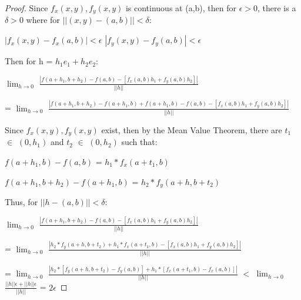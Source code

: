     \begin{proof}
        Since $f_x(x,y),f_y(x,y)$ is continuous at (a,b), then for $\epsilon > 0$,
        there is a $\delta > 0$ where for $||(x,y)-(a,b)|| < \delta$:
        
        \hspace{0.5cm}
        $|f_x(x,y) - f_x(a,b)| < \epsilon$
        \hspace{1cm}
        $|f_y(x,y) - f_y(a,b)| < \epsilon$
        
        Then for h = $h_1e_1 + h_2e_2$:

        \hspace{0.5cm}
        $\lim_{h \rightarrow 0}$
            $\frac{|f(a+h_1,b+h_2) - f(a,b) - [f_x(a,b)h_1 + f_y(a,b)h_2]|}{||h||}$

        \hspace{0.5cm}
        = $\lim_{h \rightarrow 0}$
            $\frac{|f(a+h_1,b+h_2) - f(a+h_1,b) + f(a+h_1,b) - f(a,b)
                    - [f_x(a,b)h_1 + f_y(a,b)h_2]|}{||h||}$

        Since $f_x(x,y),f_y(x,y)$ exist, then by the Mean Value Theorem,
        there are $t_1$ $\in$ $(0,h_1)$ and $t_2$ $\in$ $(0,h_2)$ such that:

        \hspace{0.5cm}
        $f(a+h_1,b) - f(a,b)$
        = $h_1 * f_x(a+t_1,b)$

        \hspace{0.5cm}
        $f(a+h_1,b+h_2) - f(a+h_1,b)$
        = $h_2 * f_y(a+h,b+t_2)$

        Thus, for $||h-(a,b)||<\delta$:

        \hspace{0.5cm}
        $\lim_{h \rightarrow 0}$
            $\frac{|f(a+h_1,b+h_2) - f(a,b) - [f_x(a,b)h_1 + f_y(a,b)h_2]|}{||h||}$
        
        \hspace{0.5cm}
        = $\lim_{h \rightarrow 0}$
            $\frac{|h_2 * f_y(a+h,b+t_2) + h_1 * f_x(a+t_1,b)
                    - [f_x(a,b)h_1 + f_y(a,b)h_2]|}{||h||}$

        \hspace{0.5cm}
        = $\lim_{h \rightarrow 0}$
            $\frac{|h_2 * [f_y(a+h,b+t_2)-f_y(a,b)]
                    + h_1 * [f_x(a+t_1,b)-f_x(a,b)]|}{||h||}$
        $<$ $\lim_{h \rightarrow 0}$
            $\frac{||h||\epsilon + ||h||\epsilon}{||h||}$
        = $2\epsilon$
    \end{proof}

